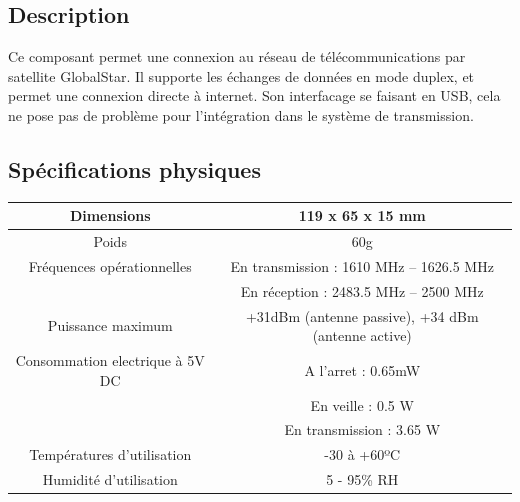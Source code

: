 \setcounter{subfigure}{0}
\begin{figure}[H]
\label{fig:satellite}
\end{figure}

\subsection{Description}

Ce composant permet une connexion au réseau de télécommunications par satellite GlobalStar. Il supporte les échanges de données en mode duplex, et permet une connexion directe à internet. Son interfacage se faisant en USB, cela ne pose pas de problème pour l'intégration dans le système de transmission.

\subsection{Spécifications physiques}

\begin{tabular}{|c|c|}
\hline Dimensions & 119 x 65 x 15 mm \\
\hline Poids & 60g \\
\hline Fréquences opérationnelles & 
En transmission : 1610 MHz – 1626.5 MHz \\
& En réception : 2483.5 MHz – 2500 MHz \\
\hline Puissance maximum & +31dBm (antenne passive), +34 dBm (antenne active) \\
\hline Consommation electrique à 5V DC & A l'arret : 0.65mW \\
& En veille : 0.5 W \\
& En transmission : 3.65 W \\ 
\hline Températures d'utilisation & -30 à +60ºC \\
\hline Humidité d'utilisation & 5 - 95\% RH \\
\hline
\end{tabular}
